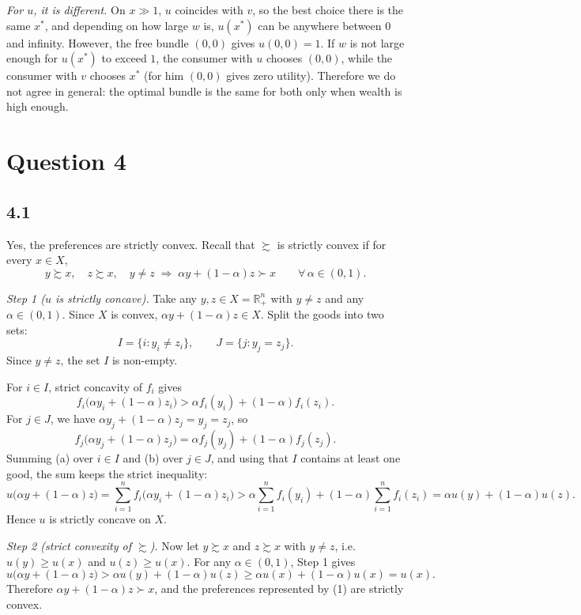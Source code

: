 \documentclass[12pt,letterpaper]{article}
\begin{document}
\textit{For $u$, it is different.} On $x\gg 1$, $u$ coincides with $v$, so the best choice there is the same $x^*$, and depending on how large $w$ is, $u(x^*)$ can be anywhere between $0$ and infinity. However, the free bundle $(0,0)$ gives $u(0,0)=1$. If $w$ is not large enough for $u(x^*)$ to exceed $1$, the consumer with $u$ chooses $(0,0)$, while the consumer with $v$ chooses $x^*$ (for him $(0,0)$ gives zero utility). Therefore we do not agree in general: the optimal bundle is the same for both only when wealth is high enough.

\section*{Question 4}

\subsection*{4.1}

Yes, the preferences are strictly convex. Recall that $\succsim$ is strictly convex if for every $x\in X$,
\[
y\succsim x,\quad z\succsim x,\quad y\neq z \;\Longrightarrow\; \alpha y+(1-\alpha)z \succ x \qquad \forall\,\alpha\in(0,1).
\]

\textit{Step 1 ($u$ is strictly concave).} Take any $y,z\in X=\mathbb{R}^n_+$ with $y\neq z$ and any $\alpha\in(0,1)$. Since $X$ is convex, $\alpha y+(1-\alpha)z\in X$. Split the goods into two sets:
\[
I=\{i : y_i\neq z_i\}, \qquad J=\{j : y_j = z_j\}.
\]
Since $y\neq z$, the set $I$ is non-empty.

For $i\in I$, strict concavity of $f_i$ gives
\[
f_i\big(\alpha y_i+(1-\alpha)z_i\big) > \alpha f_i(y_i)+(1-\alpha)f_i(z_i). \tag{a}
\]
For $j\in J$, we have $\alpha y_j+(1-\alpha)z_j = y_j = z_j$, so
\[
f_j\big(\alpha y_j+(1-\alpha)z_j\big) = \alpha f_j(y_j)+(1-\alpha)f_j(z_j). \tag{b}
\]
Summing (a) over $i\in I$ and (b) over $j\in J$, and using that $I$ contains at least one good, the sum keeps the strict inequality:
\[
u\big(\alpha y+(1-\alpha)z\big) = \sum_{i=1}^n f_i\big(\alpha y_i+(1-\alpha)z_i\big) > \alpha\sum_{i=1}^n f_i(y_i)+(1-\alpha)\sum_{i=1}^n f_i(z_i) = \alpha u(y)+(1-\alpha)u(z).
\]
Hence $u$ is strictly concave on $X$.

\textit{Step 2 (strict convexity of $\succsim$).} Now let $y\succsim x$ and $z\succsim x$ with $y\neq z$, i.e.\ $u(y)\ge u(x)$ and $u(z)\ge u(x)$. For any $\alpha\in(0,1)$, Step 1 gives
\[
u\big(\alpha y+(1-\alpha)z\big) > \alpha u(y)+(1-\alpha)u(z) \ge \alpha u(x)+(1-\alpha)u(x) = u(x).
\]
Therefore $\alpha y+(1-\alpha)z \succ x$, and the preferences represented by (1) are strictly convex.
\end{document}
